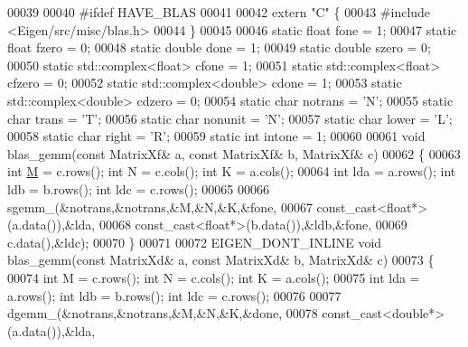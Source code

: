 \begin{DoxyCode}
00039 
00040 \textcolor{preprocessor}{#ifdef HAVE\_BLAS}
00041 
00042 \textcolor{keyword}{extern} \textcolor{stringliteral}{"C"} \{
00043 \textcolor{preprocessor}{  #include <Eigen/src/misc/blas.h>}
00044 \}
00045 
00046 \textcolor{keyword}{static} \textcolor{keywordtype}{float} fone = 1;
00047 \textcolor{keyword}{static} \textcolor{keywordtype}{float} fzero = 0;
00048 \textcolor{keyword}{static} \textcolor{keywordtype}{double} done = 1;
00049 \textcolor{keyword}{static} \textcolor{keywordtype}{double} szero = 0;
00050 \textcolor{keyword}{static} std::complex<float> cfone = 1;
00051 \textcolor{keyword}{static} std::complex<float> cfzero = 0;
00052 \textcolor{keyword}{static} std::complex<double> cdone = 1;
00053 \textcolor{keyword}{static} std::complex<double> cdzero = 0;
00054 \textcolor{keyword}{static} \textcolor{keywordtype}{char} notrans = \textcolor{charliteral}{'N'};
00055 \textcolor{keyword}{static} \textcolor{keywordtype}{char} trans = \textcolor{charliteral}{'T'};  
00056 \textcolor{keyword}{static} \textcolor{keywordtype}{char} nonunit = \textcolor{charliteral}{'N'};
00057 \textcolor{keyword}{static} \textcolor{keywordtype}{char} lower = \textcolor{charliteral}{'L'};
00058 \textcolor{keyword}{static} \textcolor{keywordtype}{char} right = \textcolor{charliteral}{'R'};
00059 \textcolor{keyword}{static} \textcolor{keywordtype}{int} intone = 1;
00060 
00061 \textcolor{keywordtype}{void} blas\_gemm(\textcolor{keyword}{const} MatrixXf& a, \textcolor{keyword}{const} MatrixXf& b, MatrixXf& c)
00062 \{
00063   \textcolor{keywordtype}{int} \hyperlink{group___core___module_class_eigen_1_1_matrix}{M} = c.rows(); \textcolor{keywordtype}{int} N = c.cols(); \textcolor{keywordtype}{int} K = a.cols();
00064   \textcolor{keywordtype}{int} lda = a.rows(); \textcolor{keywordtype}{int} ldb = b.rows(); \textcolor{keywordtype}{int} ldc = c.rows();
00065 
00066   sgemm\_(&notrans,&notrans,&M,&N,&K,&fone,
00067          const\_cast<float*>(a.data()),&lda,
00068          const\_cast<float*>(b.data()),&ldb,&fone,
00069          c.data(),&ldc);
00070 \}
00071 
00072 EIGEN\_DONT\_INLINE \textcolor{keywordtype}{void} blas\_gemm(\textcolor{keyword}{const} MatrixXd& a, \textcolor{keyword}{const} MatrixXd& b, MatrixXd& c)
00073 \{
00074   \textcolor{keywordtype}{int} M = c.rows(); \textcolor{keywordtype}{int} N = c.cols(); \textcolor{keywordtype}{int} K = a.cols();
00075   \textcolor{keywordtype}{int} lda = a.rows(); \textcolor{keywordtype}{int} ldb = b.rows(); \textcolor{keywordtype}{int} ldc = c.rows();
00076 
00077   dgemm\_(&notrans,&notrans,&M,&N,&K,&done,
00078          const\_cast<double*>(a.data()),&lda,

\end{DoxyCode}

